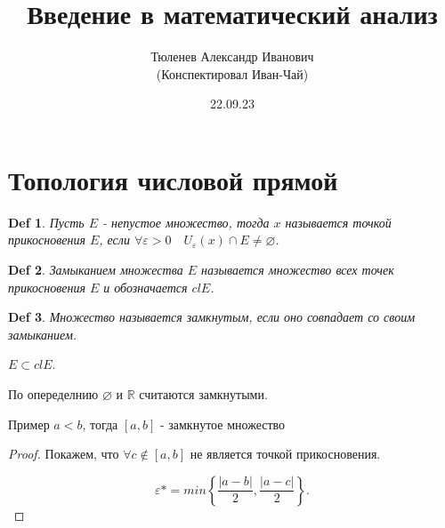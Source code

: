 \documentclass[a5paper, 10pt]{article}
\theoremstyle{plain}
\newtheorem{definition}{Def}
\newcommand{\R}{\mathbb R}
\newcommand{\eps}{\varepsilon}
\begin{document}
	\author{Тюленев Александр Иванович\\(Конспектировал Иван-Чай)}
	\date{22.09.23}
	\title{Введение в математический анализ}

	\linespread{1.4}
	\selectfont

	\maketitle
	\newpage

	\tableofcontents

    \section{Топология числовой прямой}

    \begin{definition}
        Пусть $ E $ - непустое множество, тогда $ x $ называется точкой прикосновения
        $ E $, если $ \forall \eps > 0 \quad U_{\eps}(x) \cap E \neq \varnothing $.
    \end{definition}

    \begin{definition}
        Замыканием множества $ E $ называется множество всех точек прикосновения $ E $
        и обозначается $ cl E $.
    \end{definition}

    \begin{definition}
        Множество называется замкнутым, если оно совпадает со своим замыканием.
    \end{definition}

    \begin{remark}
        $ E \subset cl E $.
    \end{remark}

    \begin{remark}
        По опеределнию $ \varnothing $ и $ \R $ считаются замкнутыми.
    \end{remark}

    Пример $ a < b $, тогда $ \left[ a, b \right]  $ - замкнутое множество

    \begin{proof}
        Покажем, что $ \forall c \not \in [a, b] $ не является точкой прикосновения.

        \[
            \eps* =min \left\{ \frac{ | a - b |}{2}, \frac{ | a - c |}{2} \right\}
        .\]
    \end{proof}
\end{document}
